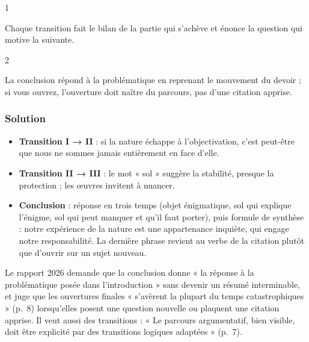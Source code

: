 \documentclass[11pt,a4paper]{article}
\providecommand{\tightlist}{\setlength{\itemsep}{0pt}\setlength{\parskip}{0pt}}
\begin{document}
\begin{indication}{1}

Chaque transition fait le bilan de la partie qui s'achève et énonce la question qui motive la suivante.

\end{indication}

\begin{indication}{2}

La conclusion répond à la problématique en reprenant le mouvement du devoir ; si vous ouvrez, l'ouverture doit naître du parcours, pas d'une citation apprise.

\end{indication}

\hypertarget{solution-6}{%
\subsubsection{Solution}\label{solution-6}}

\begin{itemize}
\tightlist
\item
  \textbf{Transition I → II} : si la nature échappe à l'objectivation, c'est peut-être que nous ne sommes jamais entièrement en face d'elle.
\item
  \textbf{Transition II → III} : le mot « sol » suggère la stabilité, presque la protection ; les œuvres invitent à nuancer.
\item
  \textbf{Conclusion} : réponse en trois temps (objet énigmatique, sol qui explique l'énigme, sol qui peut manquer et qu'il faut porter), puis formule de synthèse : notre expérience de la nature est une appartenance inquiète, qui engage notre responsabilité. La dernière phrase revient au verbe de la citation plutôt que d'ouvrir sur un sujet nouveau.
\end{itemize}

\begin{jury}

Le rapport 2026 demande que la conclusion donne « la réponse à la problématique posée dans l'introduction » sans devenir un résumé interminable, et juge que les ouvertures finales « s'avèrent la plupart du temps catastrophiques » (p.~8) lorsqu'elles posent une question nouvelle ou plaquent une citation apprise. Il veut aussi des transitions : « Le parcours argumentatif, bien visible, doit être explicité par des transitions logiques adaptées » (p.~7).

\end{jury}
\end{document}
